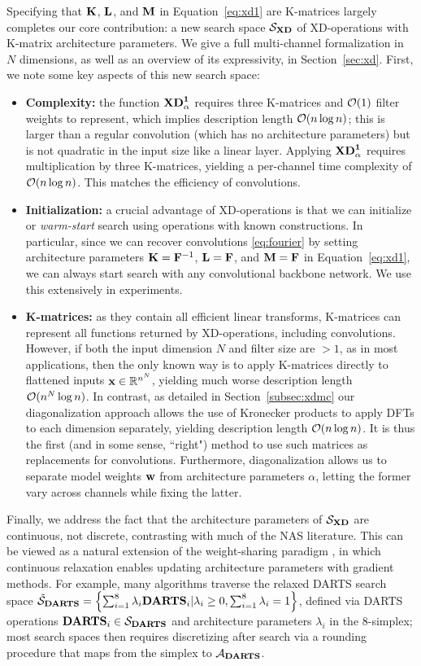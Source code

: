 Specifying that $\mathbf{K}$, $\mathbf{L}$, and $\mathbf{M}$ in Equation~\ref{eq:xd1} are K-matrices largely completes our core contribution:
a new search space $\mathcal S_{\mathbf{XD}}$ of XD-operations with K-matrix architecture parameters.
We give a full multi-channel formalization in $N$ dimensions, as well as an overview of its expressivity, in Section~\ref{sec:xd}.
First, we note some key aspects of this new search space:
\begin{itemize}[leftmargin=*,topsep=-1pt,noitemsep]\setlength\itemsep{2pt}
	\item{\bf Complexity:} the function $\mathbf{XD}_\alpha^\mathbf 1$ requires three K-matrices and $\mathcal O(1)$ filter weights to represent, which implies description length $\mathcal O(n\log n)$;
	this is larger than a regular convolution (which has no architecture parameters) but is not quadratic in the input size like a linear layer.
	Applying $\mathbf{XD}_\alpha^\mathbf 1$ requires multiplication by three K-matrices, yielding a per-channel time complexity of $\mathcal O(n\log n)$. 
	This matches the efficiency of convolutions.
	\item{\bf Initialization:} a crucial advantage of XD-operations is that we can initialize or {\em warm-start} search using operations with known constructions.
	In particular, since we can recover convolutions \eqref{eq:fourier} by setting architecture parameters $\mathbf{K}=\mathbf{F}^{-1}$, $\mathbf{L}=\mathbf{F}$, and $\mathbf{M}=\mathbf{F}$ in Equation~\ref{eq:xd1}, we can always start search with any convolutional backbone network.
	We use this extensively in experiments.
	\item{\bf K-matrices:} as they contain all efficient linear transforms, K-matrices can represent all functions returned by XD-operations, including convolutions.
	However, if both the input dimension $N$ and filter size are $>1$, as in most applications, then the only known way is to apply K-matrices directly to flattened inputs $\mathbf{x}\in\mathbb R^{n^N}$, yielding much worse description length $\mathcal O(n^N\log n)$.
	In contrast, as detailed in Section~\ref{subsec:xdmc} our diagonalization approach allows the use of Kronecker products to apply DFTs to each dimension separately, yielding description length $\mathcal O(n\log n)$.
	It is thus the first (and in some sense, ``right") method to use such matrices as replacements for convolutions.
	Furthermore, diagonalization allows us to separate model weights $\mathbf{w}$ from architecture parameters $\alpha$, letting the former vary across channels while fixing the latter.
\end{itemize}

Finally, we address the fact that the architecture parameters of $\mathcal S_{\mathbf{XD}}$ are continuous, not discrete, contrasting with much of the NAS literature.
This can be viewed as a natural extension of the weight-sharing paradigm \citep{pham2018enas}, in which continuous relaxation enables updating architecture parameters with gradient methods.
For example, many algorithms traverse the relaxed DARTS search space 
$\tilde{\mathcal S}_{\mathbf{DARTS}}=\left\{\sum_{i=1}^8\lambda_i\mathbf{DARTS}_i\vert\lambda_i\ge0,\sum_{i=1}^8\lambda_i=1\right\}$, defined via DARTS operations $\mathbf{DARTS}_i\in\mathcal S_{\mathbf{DARTS}}$ and architecture parameters $\lambda_i$ in the 8-simplex;
most search spaces then requires discretizing after search via a rounding procedure that maps from the simplex to $\mathcal A_{\mathbf{DARTS}}$.

